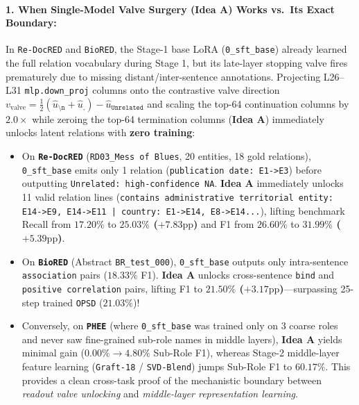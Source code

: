 \documentclass[11pt,a4paper]{article}
\begin{document}
\paragraph{1. When Single-Model Valve Surgery (\textbf{Idea A}) Works vs.\ Its Exact Boundary:}
In \texttt{Re-DocRED} and \texttt{BioRED}, the Stage-1 base LoRA (\texttt{0\_sft\_base}) already learned the full relation vocabulary during Stage 1, but its late-layer stopping valve fires prematurely due to missing distant/inter-sentence annotations. Projecting L26--L31 \texttt{mlp.down\_proj} columns onto the contrastive valve direction $v_{\text{valve}} = \frac{1}{2}(\hat{u}_{\texttt{\textbackslash n}} + \hat{u}_{\texttt{,}}) - \hat{u}_{\texttt{Unrelated}}$ and scaling the top-64 continuation columns by $2.0\times$ while zeroing the top-64 termination columns (\textbf{Idea A}) immediately unlocks latent relations with \textbf{zero training}:
\begin{itemize}
    \item On \textbf{\texttt{Re-DocRED}} (\texttt{RD03\_Mess of Blues}, 20 entities, 18 gold relations), \texttt{0\_sft\_base} emits only 1 relation (\texttt{publication date: E1->E3}) before outputting \texttt{Unrelated: high-confidence NA}. \textbf{Idea A} immediately unlocks 11 valid relation lines (\texttt{contains administrative territorial entity: E14->E9, E14->E11 | country: E1->E14, E8->E14...}), lifting benchmark Recall from $17.20\%$ to \textbf{$25.03\%$ ($+7.83\text{pp}$)} and F1 from $26.60\%$ to \textbf{$31.99\%$ ($+5.39\text{pp}$)}.
    \item On \textbf{\texttt{BioRED}} (Abstract \texttt{BR\_test\_000}), \texttt{0\_sft\_base} outputs only intra-sentence \texttt{association} pairs ($18.33\%$ F1). \textbf{Idea A} unlocks cross-sentence \texttt{bind} and \texttt{positive correlation} pairs, lifting F1 to \textbf{$21.50\%$ ($+3.17\text{pp}$)}—surpassing 25-step trained \texttt{OPSD} ($21.03\%$)!
    \item Conversely, on \textbf{\texttt{PHEE}} (where \texttt{0\_sft\_base} was trained only on 3 coarse roles and never saw fine-grained sub-role names in middle layers), \textbf{Idea A} yields minimal gain ($0.00\% \to 4.80\%$ Sub-Role F1), whereas Stage-2 middle-layer feature learning (\texttt{Graft-18} / \texttt{SVD-Blend}) jumps Sub-Role F1 to \textbf{$60.17\%$}. This provides a clean cross-task proof of the mechanistic boundary between \emph{readout valve unlocking} and \emph{middle-layer representation learning}.
\end{itemize}
\end{document}
